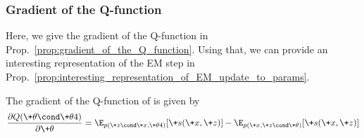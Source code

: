 \documentclass{article} %
\newcommand{\sufficientStatsFunction}{\+s}
\newcommand{\param}{\+\theta}
\begin{document}
    



\subsubsection{Gradient of the Q-function}

 Here, we give the gradient of the Q-function in Prop.~\ref{prop:gradient_of_the_Q_function}. Using that, we can provide an interesting representation of the EM step  in Prop.~\ref{prop:interesting_representation_of_EM_update_to_params}. 


\begin{proposition}
 The gradient of the Q-function of 
is given by 
 \begin{align}
 \frac{\partial Q(\param \cond \param^^t)}{\partial \param} =  \E_{p(\+z \cond \+x, \param^^t)}[\sufficientStatsFunction(\+x,\+z)] - 	\E_{p(\+x, \+z \cond \param)}[\sufficientStatsFunction(\+x,\+z)]
 \label{eqn:gradient_of_Q_function_for_EM}
 \end{align}
%
\label{prop:gradient_of_the_Q_function}
 \end{proposition}
\end{document}
